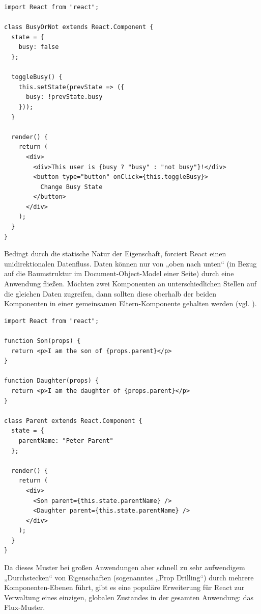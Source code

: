 \begin{minipage}{\linewidth}
\begin{lstlisting}[caption={Jede Komponente kann über einen modifizierbaren Zustand verfügen.}]
import React from "react";

class BusyOrNot extends React.Component {
  state = {
    busy: false
  };

  toggleBusy() {
    this.setState(prevState => ({
      busy: !prevState.busy
    }));
  }

  render() {
    return (
      <div>
        <div>This user is {busy ? "busy" : "not busy"}!</div>
        <button type="button" onClick={this.toggleBusy}>
          Change Busy State
        </button>
      </div>
    );
  }
}
\end{lstlisting}
\end{minipage}

Bedingt durch die statische Natur der Eigenschaft, forciert React einen unidirektionalen Datenfluss. Daten können nur von „oben nach unten“ (in Bezug auf die Baumstruktur im Document-Object-Model einer Seite) durch eine Anwendung fließen. Möchten zwei Komponenten an unterschiedlichen Stellen auf die gleichen Daten zugreifen, dann sollten diese oberhalb der beiden Komponenten in einer gemeinsamen Eltern-Komponente gehalten werden (vgl. \cite{web:react_lift_state_up}).\newline

\begin{minipage}{\linewidth}
\begin{lstlisting}[label={code:functionalcomponents},caption={„Lifting state up“: Mehrere Komponenten greifen auf die gleichen Daten zu.}]
import React from "react";

function Son(props) {
  return <p>I am the son of {props.parent}</p>
}

function Daughter(props) {
  return <p>I am the daughter of {props.parent}</p>
}

class Parent extends React.Component {
  state = {
    parentName: "Peter Parent"
  };

  render() {
    return (
      <div>
        <Son parent={this.state.parentName} />
        <Daughter parent={this.state.parentName} />
      </div>
    );
  }
}
\end{lstlisting}
\end{minipage}

Da dieses Muster bei großen Anwendungen aber schnell zu sehr aufwendigem „Durchstecken“ von Eigenschaften (sogenanntes „Prop Drilling“) durch mehrere Komponenten-Ebenen führt, gibt es eine populäre Erweiterung für React zur Verwaltung eines einzigen, globalen Zustandes in der gesamten Anwendung: das Flux-Muster.


